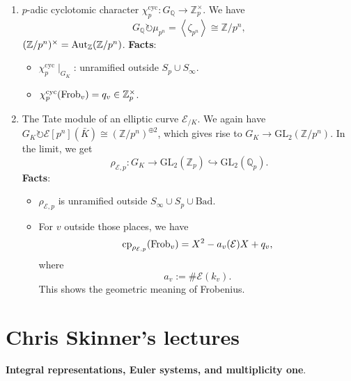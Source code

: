\documentclass[reqno]{amsart} 
\begin{document}
\begin{example}
  \begin{enumerate}
  \item\label{enumerate:cq6r3ki8zp} $p$-adic cyclotomic character $\chi_p^{\mathrm{cyc}} : G_{\mathbb{Q}} \rightarrow \mathbb{Z}_p^\times$.  We have
    \begin{equation*}
      G_{\mathbb{Q}} \circlearrowright \mu_{p^n} = \left\langle \zeta_{p^n} \right\rangle \cong \mathbb{Z} / p^n,
    \end{equation*}
    $(\mathbb{Z} / p^n)^\times = \operatorname{Aut}_{\mathbb{Z}}(\mathbb{Z} / p^n)$.
    \textbf{Facts}:
    \begin{itemize}
    \item $\chi_p^{\mathrm{cyc}} \mid_{G_K}$: unramified outside $S_p \cup S_\infty$.
    \item $\chi_p^{\mathrm{cyc}}(\operatorname{Frob}_v) = q_v \in \mathbb{Z}_p^\times$.
    \end{itemize}
  \item\label{enumerate:cq6r3ki7yl} The Tate module of an elliptic curve $\mathcal{E}_{/ K}$.  We again have $G_K \circlearrowright \mathcal{E}[p^n](\bar{K}) \cong(\mathbb{Z} / p^n)^{\oplus 2}$, which gives rise to $G_K \rightarrow \mathrm{GL}_2(\mathbb{Z} / p^n)$.  In the limit, we get
    \begin{equation*}
      \rho_{\mathcal{E}, p} : G_K \rightarrow \mathrm{GL}_2(\mathbb{Z}_p) \hookrightarrow \mathrm{GL}_2(\mathbb{Q}_p).
    \end{equation*}
    \textbf{Facts}:
    \begin{itemize}
    \item $\rho_{\mathcal{E},p}$ is unramified outside $S_\infty \cup S_p \cup \mathrm{Bad}$.
    \item For $v$ outside those places, we have
      \begin{equation*}
        \mathrm{c p}_{\rho_{\mathcal{E}, p}}(\operatorname{Frob}_v) = X^2 - a_v(\mathcal{E}) X + q_v,
      \end{equation*}
      where
      \begin{equation*}
        a_v := \# \mathcal{E}(k_v).
      \end{equation*}
      This  shows the geometric meaning of Frobenius.
    \end{itemize}
  \end{enumerate}
\end{example}

\part{Chris Skinner's lectures}
\textbf{Integral representations, Euler systems, and multiplicity one}.
\end{document}
